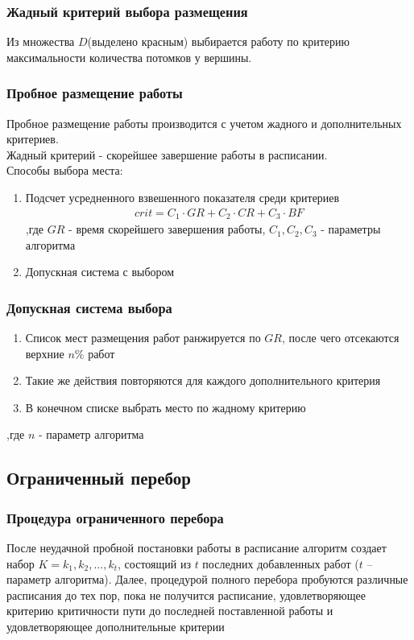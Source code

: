 \documentclass[hyperref=unicode, aspectratio=169]{beamer}
\begin{document}
\begin{frame}
    \frametitle{Жадный критерий выбора размещения}
    Из множества $D$(выделено красным) выбирается работу по критерию максимальности количества потомков у вершины.
    
\end{frame}

\begin{frame}
    \frametitle{Пробное размещение работы}
    Пробное размещение работы производится с учетом  жадного и дополнительных критериев. \\
    Жадный критерий - скорейшее завершение работы в расписании. \\
    Способы выбора места:
    \begin{enumerate}
        \item Подсчет усредненного взвешенного показателя среди критериев \\
              \begin{gather*}
                  crit = C_1 \cdot GR + C_2 \cdot CR + C_3 \cdot BF
              \end{gather*}
              ,где $GR$ - время скорейшего завершения работы, $C_1, C_2, C_3$ - параметры алгоритма
        \item Допускная система с выбором
    \end{enumerate}
\end{frame}

\begin{frame}
    \frametitle{Допускная система выбора}
    \begin{enumerate}
        \item Список мест размещения работ ранжируется по $GR$, после чего отсекаются верхние $n\%$ работ
        \item Такие же действия повторяются для каждого дополнительного критерия
        \item В конечном списке выбрать место по жадному критерию
    \end{enumerate}
    ,где $n$ - параметр алгоритма
\end{frame}


\subsection{Ограниченный перебор}
\begin{frame}
    \frametitle{Процедура ограниченного перебора}
    После неудачной пробной постановки работы в расписание алгоритм создает набор $K=k_1,k_2,\dots,k_t$, состоящий из $t$ последних добавленных работ ($t$ – параметр алгоритма). Далее, процедурой полного перебора пробуются различные расписания до тех пор, пока не получится расписание, удовлетворяющее критерию критичности пути до последней поставленной работы и удовлетворяющее дополнительные критерии
\end{frame}
\end{document}
